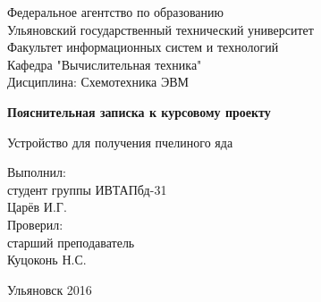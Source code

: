 
\begin{center}
	\renewcommand{\baselinestretch}{1}
	\small
		Федеральное агентство по образованию \\
		Ульяновский государственный технический университет \\
		Факультет информационных систем и технологий \\
		Кафедра "Вычислительная техника" \\
	
	\normalsize
	\vspace{30ex}
	\renewcommand{\baselinestretch}{1.5}
		Дисциплина: Схемотехника ЭВМ
		
	\renewcommand{\baselinestretch}{1.5}
	\large 
		\textbf{Пояснительная записка к курсовому проекту}
		
		Устройство для получения пчелиного яда
\end{center}

\vspace{20ex}
\begin{flushright}
	Выполнил: \\
	студент группы ИВТАПбд-31 \\
	Царёв И.Г. \\
	Проверил: \\ 
	старший преподаватель \\
	Куцоконь Н.С.
\end{flushright}

\vfill
\begin{center}
	Ульяновск 2016
\end{center}